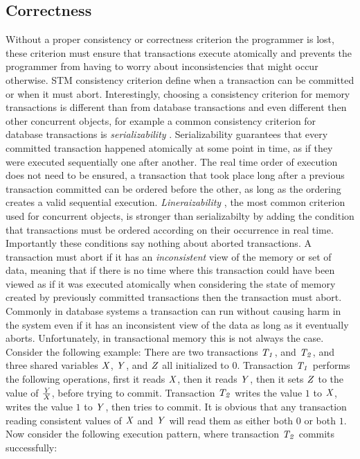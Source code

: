 \subsection{Correctness}

Without a proper consistency or correctness criterion the programmer is lost, these criterion must ensure that transactions execute
atomically and prevents the programmer from having to worry about inconsistencies that might occur otherwise.
STM consistency criterion define when a transaction can be committed or when it must abort. 
Interestingly, choosing a consistency criterion for memory transactions is different than from database transactions
and even different then other concurrent objects,
for example a common consistency criterion for database transactions is \emph{serializability} \cite{P79}.  
Serializability guarantees that every committed transaction happened atomically at some point in time,
 as if they were executed sequentially one after another.
The real time order of execution does not need to be ensured,
a transaction that took place long after a previous transaction committed can
 be ordered before the other, as long as the ordering creates a valid sequential execution.
\emph{Lineraizability} \cite{HW90}, the most common criterion used for concurrent objects, is stronger than serializabilty by
adding the condition that transactions must be ordered according on their occurrence in real time.
Importantly these conditions say nothing about aborted transactions.
A transaction must abort if it has an \emph{inconsistent} view of the memory or set of data,
meaning that if there is no time where this transaction could have been viewed as if it was executed atomically when considering
the state of memory created by previously committed transactions then the transaction must abort.
Commonly in database
systems a transaction can run without causing harm in the system even if it 
has an inconsistent view of the data as long as it eventually aborts.
Unfortunately, in transactional memory this is not always the case.
Consider the following example:  There are two transactions $\ms{T_1}$, and $\ms{T_2}$, and three 
shared variables $\ms{X}$, $\ms{Y}$, and $\ms{Z}$ all initialized to $0$.  Transaction $\ms{T_1}$ performs
the following operations, first it reads $\ms{X}$, then it reads $\ms{Y}$, then it sets $\ms{Z}$ to 
the value of $\frac{\ms{Y}}{\ms{X}}$, before trying to commit.
Transaction $\ms{T_2}$ writes the value $1$ to $\ms{X}$, writes the value $1$ to $\ms{Y}$, 
then tries to commit.
It is obvious that any transaction reading consistent values of $\ms{X}$ and $\ms{Y}$ 
will read them as either both $0$ or both $1$.
Now consider the following execution pattern, where transaction $\ms{T_2}$ commits successfully:

